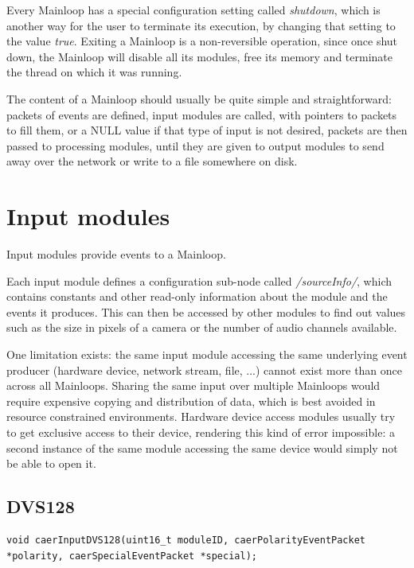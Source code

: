 \documentclass[a4paper,12pt]{report}
\begin{document}
Every Mainloop has a special configuration setting called \emph{shutdown}, which is another way for the user to terminate its execution, by changing that setting to the value \emph{true}.
Exiting a Mainloop is a non-reversible operation, since once shut down, the Mainloop will disable all its modules, free its memory and terminate the thread on which it was running.

The content of a Mainloop should usually be quite simple and straightforward: packets of events are defined, input modules are called, with pointers to packets to fill them, or a NULL value if that type of input is not desired, packets are then passed to processing modules, until they are given to output modules to send away over the network or write to a file somewhere on disk.

\section{Input modules} \label{sec:input_modules}

Input modules provide events to a Mainloop.

Each input module defines a configuration sub-node called \emph{/sourceInfo/}, which contains constants and other read-only information about the module and the events it produces. This can then be accessed by other modules to find out values such as the size in pixels of a camera or the number of audio channels available.

One limitation exists: the same input module accessing the same underlying event producer (hardware device, network stream, file, ...) cannot exist more than once across all Mainloops. Sharing the same input over multiple Mainloops would require expensive copying and distribution of data, which is best avoided in resource constrained environments.
Hardware device access modules usually try to get exclusive access to their device, rendering this kind of error impossible: a second instance of the same module accessing the same device would simply not be able to open it.
\clearpage
\subsection{DVS128} \label{subsec:dvs128}

\begin{lstlisting}
void caerInputDVS128(uint16_t moduleID, caerPolarityEventPacket *polarity, caerSpecialEventPacket *special);
\end{lstlisting}
\end{document}
